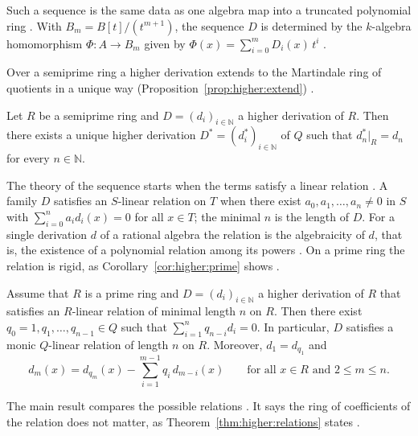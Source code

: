 Such a sequence is the same data as one algebra map into a truncated
polynomial ring \cite[p.~2984]{NarvaezMacarro2009}. With
$B_m=B[t]/(t^{m+1})$, the sequence $D$ is determined by the $k$-algebra
homomorphism $\Phi\colon A\to B_m$ given by
$\Phi(x)=\sum_{i=0}^{m} D_i(x)\,t^i$ \cite[p.~2984]{NarvaezMacarro2009}.

Over a semiprime ring a higher derivation extends to the Martindale ring of
quotients in a unique way (Proposition~\ref{prop:higher:extend})
\cite[p.~2323]{FerreroHaetinger2002}.

\begin{proposition}\label{prop:higher:extend}
Let $R$ be a semiprime ring and $D=(d_i)_{i\in\mathbb{N}}$ a higher
derivation of $R$. Then there exists a unique higher derivation
$D^{*}=(d^{*}_i)_{i\in\mathbb{N}}$ of $Q$ such that
$d^{*}_n|_R=d_n$ for every $n\in\mathbb{N}$.
\end{proposition}

The theory of the sequence starts when the terms satisfy a linear relation
\cite[p.~2323]{FerreroHaetinger2002}. A family $D$ satisfies an $S$-linear
relation on $T$ when there exist $a_0,a_1,\dots,a_n\neq 0$ in $S$ with
$\sum_{i=0}^{n} a_i d_i(x)=0$ for all $x\in T$; the minimal $n$ is the
length of $D$. For a single derivation $d$ of a rational algebra the
relation is the algebraicity of $d$, that is, the existence of a polynomial
relation among its powers \cite[p.~2322]{FerreroHaetinger2002}. On a prime
ring the relation is rigid, as Corollary~\ref{cor:higher:prime} shows
\cite[p.~2325]{FerreroHaetinger2002}.

\begin{corollary}\label{cor:higher:prime}
Assume that $R$ is a prime ring and $D=(d_i)_{i\in\mathbb{N}}$ a higher
derivation of $R$ that satisfies an $R$-linear relation of minimal length
$n$ on $R$. Then there exist $q_0=1,q_1,\dots,q_{n-1}\in Q$ such that
$\sum_{i=1}^{n} q_{n-i} d_i=0$. In particular, $D$ satisfies a monic
$Q$-linear relation of length $n$ on $R$. Moreover, $d_1=d_{q_1}$ and
\begin{equation*}
d_m(x)=d_{q_m}(x)-\sum_{i=1}^{m-1} q_i\,d_{m-i}(x)
\qquad\text{for all }x\in R\text{ and }2\leq m\leq n.
\end{equation*}
\end{corollary}

The main result compares the possible relations
\cite[pp.~2327--2328]{FerreroHaetinger2002}. It says the ring of
coefficients of the relation does not matter, as
Theorem~\ref{thm:higher:relations} states
\cite[p.~2327]{FerreroHaetinger2002}.


